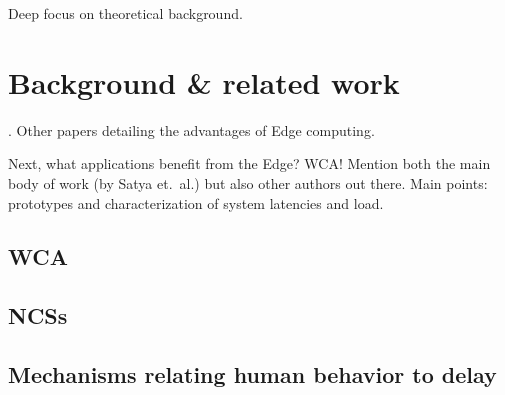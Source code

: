 Deep focus on theoretical background.

\section{Background \& related work}
\textcite{Satya2009Case}.
Other papers detailing the advantages of Edge computing.

Next, what applications benefit from the Edge?
\gls{WCA}! Mention both the main body of work (by Satya et.\ al.) but also other authors out there.
Main points: prototypes and characterization of system latencies and load.

\subsection{\acs{WCA}}
\subsection{\acsp{NCS}}
\subsection{Mechanisms relating human behavior to delay}
